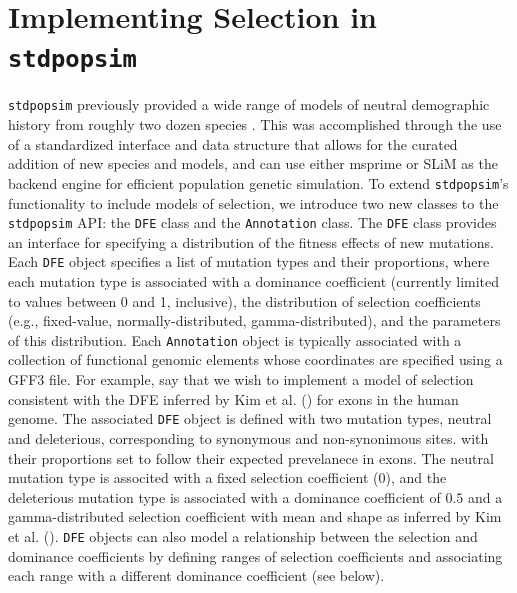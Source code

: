 \documentclass[hidelinks]{article}
\newcommand{\stdpopsim}{\texttt{stdpopsim}\xspace}
\begin{document}
\section*{Implementing Selection in \stdpopsim}
    \label{selection}

    \stdpopsim previously provided a wide range of models of neutral
    demographic history from roughly two dozen species \citep{lauterbur2023expanding}.
    This was accomplished through the use of a standardized interface
    and data structure that allows for the curated addition of new
    species and models, and can use either
    msprime \citep{Baumdicker2022} or SLiM \citep{haller2019slim}
    as the backend engine for efficient population genetic simulation.
    To extend \stdpopsim's functionality to include models of selection, 
    we introduce two new classes
    to the \stdpopsim API: the \texttt{DFE} class and the \texttt{Annotation} class.
    The \texttt{DFE} class provides an interface for specifying
    a distribution of the fitness effects of new mutations.
    Each \texttt{DFE} object specifies a list of mutation types and
    their proportions, where 
    each mutation type is associated with a dominance coefficient
    (currently limited to values between 0 and 1, inclusive),
    the distribution of selection coefficients (e.g., fixed-value, normally-distributed, gamma-distributed),
    and the parameters of this distribution.
    Each \texttt{Annotation} object is typically associated with a collection of functional
    genomic elements whose coordinates are specified using a GFF3 file. %
    For example, say that we wish to implement a model of selection consistent with the
    DFE inferred by Kim et al. (\citeyear{kim2017inference}) for exons in the human genome.
    The associated \texttt{DFE} object is defined with two mutation types,
    neutral and deleterious, corresponding to synonymous and non-synonimous sites.
    with their proportions set to follow their expected
    prevelanece in exons. 
    The neutral mutation type is associted with a fixed selection coefficient (0),
    and the deleterious mutation type is associated with a dominance coefficient of $0.5$ and
    a gamma-distributed selection coefficient
    with mean and shape as inferred by Kim et al. (\citeyear{kim2017inference}).
    \texttt{DFE} objects can also model a relationship between the selection and dominance coefficients \citep{huber2018gene}
    by defining ranges of selection coefficients and associating each range with a different dominance coefficient (see below).
    
\end{document}
